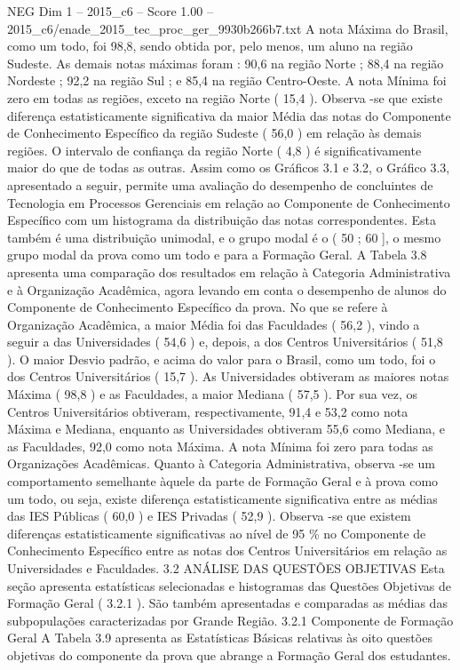 \begin{textsample}{NEG Dim 1 – 2015\_c6 – Score 1.00 – 2015\_c6/enade\_2015\_tec\_proc\_ger\_9930b266b7.txt}
A nota Máxima do Brasil, como um todo, foi 98,8, sendo obtida por, pelo menos, um aluno na região Sudeste.
As demais notas máximas foram : 90,6 na região Norte ; 88,4 na região Nordeste ; 92,2 na região Sul ; e 85,4 na região Centro-Oeste.
A nota Mínima foi zero em todas as regiões, exceto na região Norte ( 15,4 ).
Observa -se que existe diferença estatisticamente significativa da maior Média das notas do Componente de Conhecimento Específico da região Sudeste ( 56,0 ) em relação às demais regiões.
O intervalo de confiança da região Norte ( 4,8 ) é significativamente maior do que de todas as outras.
Assim como os Gráficos 3.1 e 3.2, o Gráfico 3.3, apresentado a seguir, permite uma avaliação do desempenho de concluintes de Tecnologia em Processos Gerenciais em relação ao Componente de Conhecimento Específico com um histograma da distribuição das notas correspondentes.
Esta também é uma distribuição unimodal, e o grupo modal é o ( 50 ; 60 ], o mesmo grupo modal da prova como um todo e para a Formação Geral.
A Tabela 3.8 apresenta uma comparação dos resultados em relação à Categoria Administrativa e à Organização Acadêmica, agora levando em conta o desempenho de alunos do Componente de Conhecimento Específico da prova.
No que se refere à Organização Acadêmica, a maior Média foi das Faculdades ( 56,2 ), vindo a seguir a das Universidades ( 54,6 ) e, depois, a dos Centros Universitários ( 51,8 ).
O maior Desvio padrão, e acima do valor para o Brasil, como um todo, foi o dos Centros Universitários ( 15,7 ).
As Universidades obtiveram as maiores notas Máxima ( 98,8 ) e as Faculdades, a maior Mediana ( 57,5 ).
Por sua vez, os Centros Universitários obtiveram, respectivamente, 91,4 e 53,2 como nota Máxima e Mediana, enquanto as Universidades obtiveram 55,6 como Mediana, e as Faculdades, 92,0 como nota Máxima.
A nota Mínima foi zero para todas as Organizações Acadêmicas.
Quanto à Categoria Administrativa, observa -se um comportamento semelhante àquele da parte de Formação Geral e à prova como um todo, ou seja, existe diferença estatisticamente significativa entre as médias das IES Públicas ( 60,0 ) e IES Privadas ( 52,9 ).
Observa -se que existem diferenças estatisticamente significativas ao nível de 95 \% no Componente de Conhecimento Específico entre as notas dos Centros Universitários em relação as Universidades e Faculdades. 3.2 ANÁLISE DAS QUESTÕES OBJETIVAS Esta seção apresenta estatísticas selecionadas e histogramas das Questões Objetivas de Formação Geral ( 3.2.1 ).
São também apresentadas e comparadas as médias das subpopulações caracterizadas por Grande Região. 3.2.1 Componente de Formação Geral A Tabela 3.9 apresenta as Estatísticas Básicas relativas às oito questões objetivas do componente da prova que abrange a Formação Geral dos estudantes.

\end{textsample}
